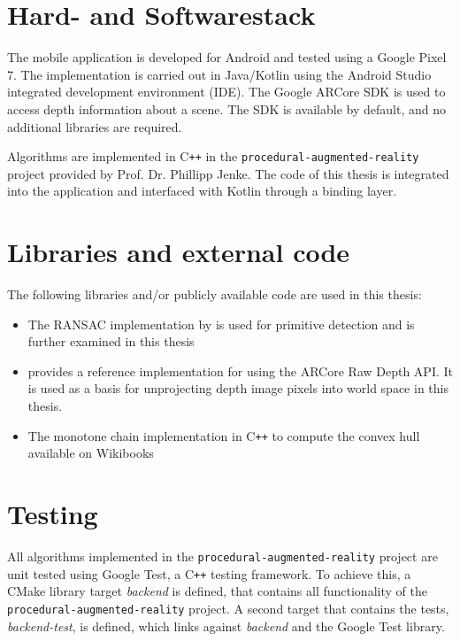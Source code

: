 \section{Hard- and Softwarestack}

The mobile application is developed for Android and tested using a Google Pixel 7.
The implementation is carried out in Java/Kotlin using the Android Studio integrated development environment (IDE).
The Google ARCore SDK is used to access depth information about a scene.
The SDK is available by default, and no additional libraries are required.

Algorithms are implemented in C\texttt{++} in the \texttt{procedural-augmented-reality} project provided by Prof. Dr. Phillipp Jenke.
The code of this thesis is integrated into the application and interfaced with Kotlin through a binding layer.

\section{Libraries and external code}
The following libraries and/or publicly available code are used in this thesis:
\begin{itemize}
    \item The RANSAC implementation by \citeauthor{schnabel_efficient_2007} is used for primitive detection
    and is further examined in this thesis~\parencite{schnabel_efficient_2007}
    \item {} provides a reference implementation for using the ARCore Raw Depth API\@.
    It is used as a basis for unprojecting depth image pixels into world space in this thesis.~\parencite{google_llc_codelab_raw_depth}
    \item The monotone chain implementation in C\texttt{++} to compute the convex hull available on Wikibooks~
\end{itemize}

\section{Testing}

All algorithms implemented in the \texttt{procedural-augmented-reality} project are unit tested using
Google Test, a C\texttt{++} testing framework.
To achieve this, a CMake library target \textit{backend} is defined,
that contains all functionality of the \texttt{procedural-augmented-reality} project.
A second target that contains the tests, \textit{backend-test}, is defined,
which links against \textit{backend} and the Google Test library.

